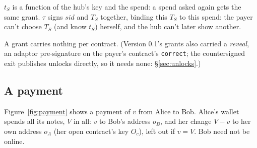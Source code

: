 \documentclass[11pt]{article}
\theoremstyle{plain}
\theoremstyle{definition}
\newcommand{\tx}[1]{\texttt{#1}}
\newcommand{\sid}{\mathit{sid}}
\newcommand{\Oc}{O_c}
\begin{document}
$t_S$ is a function of the hub's key and the spend: a spend asked again
gets the same grant. $\tau$ signs $\sid$ and $T_S$ together, binding
this $T_S$ to this spend: the payer can't choose $T_S$ (and know $t_S$)
herself, and the hub can't later show another.

A grant carries nothing per contract. (Version 0.1's grants also carried
a \emph{reveal}, an adaptor pre-signature on the payer's contract's
\tx{correct}; the countersigned exit publishes unlocks directly, so it
needs none: \S\ref{sec:unlocks}.)

\subsection{A payment}\label{sec:payment}

Figure~\ref{fig:payment} shows a payment of $v$ from Alice to Bob.
Alice's wallet spends all its notes, $V$ in all: $v$ to Bob's address
$o_B$, and her change $V - v$ to her own address $o_A$ (her open
contract's key $\Oc$), left out if $v = V$. Bob need not be online.
\end{document}
